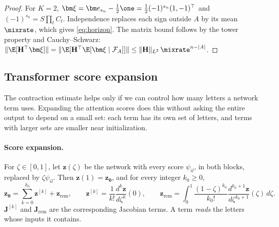 \begin{proof}
For $K=2$, $\bm\xi=\bm e_{s_n}-\frac12\one=\frac12(-1)^{s_n}(1,-1)^\top$ and $(-1)^{s_n}=S\prod_tC_t$. Independence replaces each sign outside $A$
by its mean $\mixrate$, which gives \cref{eq:horizon}. The matrix bound follows by the tower property and Cauchy--Schwarz:
$\|\E[\mathbf H^\top\bm\xi]\|=\|\E[\mathbf H^\top\E[\bm\xi\mid\mathcal F_A]]\|\le\|\mathbf H\|_{L^2}\,\mixrate^{n-|A|}$.
\end{proof}

\subsection{Transformer score expansion}
\label{app:model-spectrum}

The contraction estimate helps only if we can control how many letters a network term uses. Expanding the attention scores does
this without asking the entire output to depend on a small set: each term has its own set of letters, and terms with larger sets
are smaller near initialization.

\paragraph{Score expansion.} For $\zeta\in[0,1]$, let $\bm z(\zeta)$ be the network with every score $\psi_{il}$, in both blocks, replaced by
$\zeta\psi_{il}$. Then $\bm z(1)=\bm z_{\bm\theta}$, and for every integer $k_0\ge0$,
\begin{equation}
 \bm z_{\bm\theta}=\sum_{k=0}^{k_0}\bm z^{[k]}+\bm z_{\mathrm{rem}},\qquad
 \bm z^{[k]}=\frac{1}{k!}\frac{d^k\bm z}{d\zeta^k}(0),\qquad
 \bm z_{\mathrm{rem}}=\int_0^1\frac{(1-\zeta)^{k_0}}{k_0!}\frac{d^{k_0+1}\bm z}{d\zeta^{k_0+1}}(\zeta)\,d\zeta .
 \label{eq:score-split}
\end{equation}
$\mathbf J^{[k]}$ and $\mathbf J_{\mathrm{rem}}$ are the corresponding Jacobian terms. A term \emph{reads} the letters whose inputs it contains.

